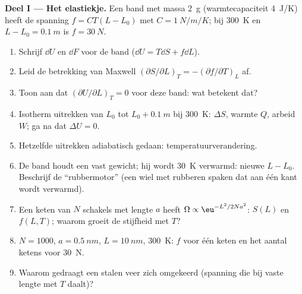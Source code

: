 \begin{problem}\label{pb:b2:thermodynamic-potentials:1}
\textbf{Deel I --- Het elastiekje.}
Een band met massa \qty{2}{g} (warmtecapaciteit \qty{4}{J/K}) heeft de spanning
$f = CT(L - L_0)$ met $C = \qty{1}{N/m/K}$; bij \qty{300}{K} en
$L - L_0 =
\qty{0.1}{m}$ is $f = \qty{30}{N}$.
\begin{enumerate}
  \item Schrijf $\dd U$ en $\dd F$ voor de band ($\dd U = T\dd S + f\dd L$).
  \item Leid de betrekking van Maxwell
        $(\partial S/\partial L)_T = -(\partial
        f/\partial T)_L$ af.
  \item Toon aan dat $(\partial U/\partial L)_T = 0$ voor deze band: wat
        betekent dat?
  \item Isotherm uitrekken van $L_0$ tot $L_0 + \qty{0.1}{m}$ bij
        \qty{300}{K}: $\Delta S$, warmte $Q$, arbeid $W$; ga na dat $\Delta U = 0$.
  \item Hetzelfde uitrekken adiabatisch gedaan: temperatuurverandering.
  \item De band houdt een vast gewicht; hij wordt \qty{30}{K} verwarmd: nieuwe
        $L - L_0$. Beschrijf de ``rubbermotor'' (een wiel met rubberen
        spaken dat aan één kant wordt verwarmd).
  \item Een keten van $N$ schakels met lengte $a$ heeft
        $\Omega \propto \eu^{-L^2/2Na^2}$:
        $S(L)$ en $f(L,T)$; waarom groeit de stijfheid met $T$?
  \item $N = 1000$, $a = \qty{0.5}{nm}$, $L = \qty{10}{nm}$, \qty{300}{K}: $f$
        voor één keten en het aantal ketens voor \qty{30}{N}.
  \item Waarom gedraagt een stalen veer zich omgekeerd (spanning die bij
        vaste lengte met $T$ daalt)?
\end{enumerate}


\end{problem}
